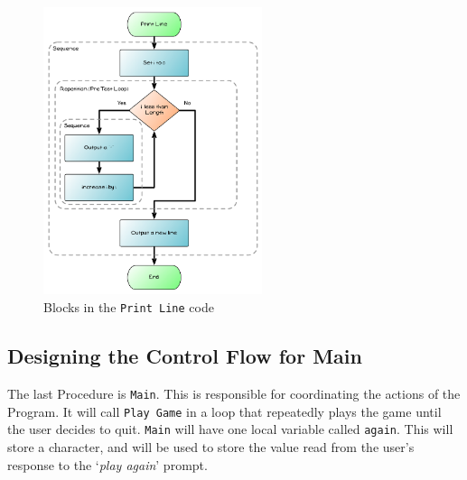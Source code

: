 \begin{figure}[htbp]
   \centering
   \includegraphics[width=0.57\textwidth]{./topics/control-flow/diagrams/PrintLine1} 
   \caption{Blocks in the \texttt{Print Line} code}
   \label{fig:print-line-1}
\end{figure}





\clearpage
\subsection{Designing the Control Flow for Main} %
\label{sub:designing_the_control_flow_for_main}

The last Procedure is \texttt{Main}. This is responsible for coordinating the actions of the Program. It will call \texttt{Play Game} in a loop that repeatedly plays the game until the user decides to quit. \texttt{Main} will have one local variable called \texttt{again}. This will store a character, and will be used to store the value read from the user's response to the `\emph{play again}' prompt.

